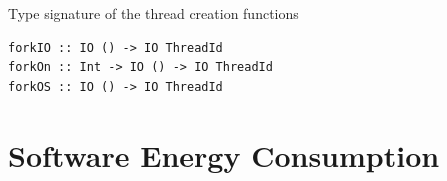 \begin{listing}
  \caption{Type signature of the thread creation functions}
  \begin{verbatim}
forkIO :: IO () -> IO ThreadId
forkOn :: Int -> IO () -> IO ThreadId
forkOS :: IO () -> IO ThreadId
  \end{verbatim}
  \label{code:fork-sig}
\end{listing}




\section{Software Energy Consumption}
\lipsum[1-4]
